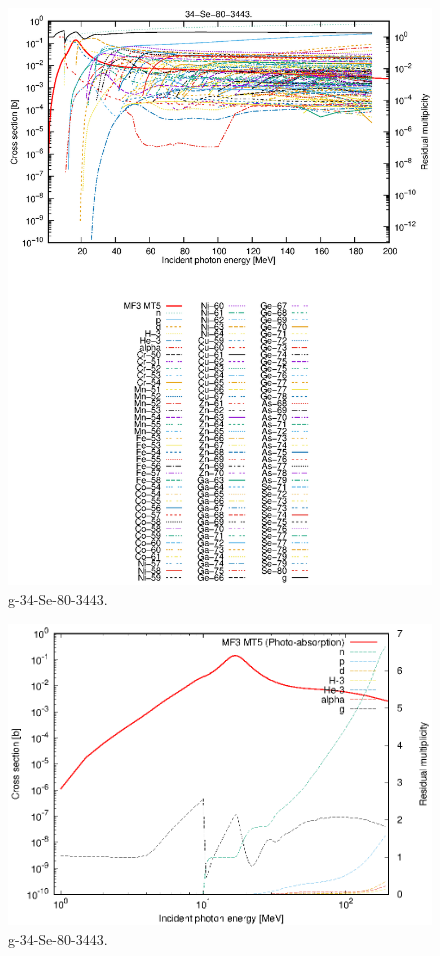 \begin{figure}
 \includegraphics[width=\linewidth]{eps/g_34-Se-80_3443.eps}
  \caption{g-34-Se-80-3443.}
\end{figure}
\newpage \clearpage

\begin{figure}
 \includegraphics[width=\linewidth]{eps-log/g_34-Se-80_3443.eps}
 \caption{g-34-Se-80-3443.}
\end{figure}
\newpage \clearpage

